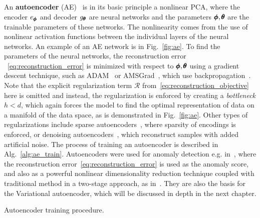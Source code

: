 An \textbf{autoencoder} (AE)~\cite{kramer1991nonlinear} is in its basic principle a nonlinear PCA, where the encoder $e_{\pmb{{\phi}}}$ and decoder $g_{\pmb{{\theta}}}$ are neural networks and the parameters $\pmb{{\phi}},\pmb{{\theta}}$ are the trainable parameters of these networks. The nonlinearity comes from the use of nonlinear activation functions between the individual layers of the neural networks. An example of an AE network is in Fig.~\ref{fig:ae}.  To find the parameters of the neural networks, the reconstruction error ~\eqref{eq:reconstruction_error} is minimized with respect to $\pmb{{\phi}},\pmb{{\theta}}$ using a gradient descent technique, such as ADAM~\cite{kingma2014adam} or AMSGrad~\cite{reddi2019convergence}, which use backpropagation~\cite{werbos1982applications}. Note that the explicit regularization term $\mathcal{R}$ from~\eqref{eq:reconstruction_objective} here is omitted and instead, the regularization is enforced by creating a \textit{bottleneck} $h < d$, which again forces the model to find the optimal representation of data on a manifold of the data space, as is demonstrated in Fig.~\ref{fig:ae}. Other types of regularizations include sparse autoencoders~\cite{deng2013sparse}, where sparsity of encodings is enforced, or denoising autoencoders~\cite{lu2013speech}, which reconstruct samples with added artificial noise. The process of training an autoencoder is described in Alg.~\ref{alg:ae_train}. Autoencoders were used for anomaly detection e.g. in~\cite{sakurada2014anomaly,thompson2002implicit}, where the reconstruction error~\eqref{eq:reconstruction_error} is used as the anomaly score, and also as a powerful nonlinear dimensionality reduction technique coupled with traditional method in a two-stage approach, as in~\cite{erfani2016high, amarbayasgalan2018unsupervised}. They are also the basis for the Variational autoencoder, which will be discussed in depth in the next chapter.

\begin{algorithm}
\caption{Autoencoder training procedure.}
\label{alg:ae_train}
\end{algorithm}

